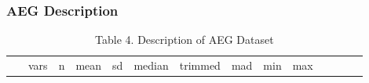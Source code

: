 \subsubsection{AEG Description}\label{aeg-description}

\begin{Shaded}
\begin{Highlighting}[]
\NormalTok{(}\NormalTok{(AEG[,}\NormalTok{:}\NormalTok{]), } \NormalTok{, } \NormalTok{)}
\end{Highlighting}
\end{Shaded}

\begin{longtable}[]{@{}cccccccccccccc@{}}
\caption{Table 4. Description of AEG Dataset}\tabularnewline
\toprule
\begin{minipage}[b]{0.07\columnwidth}\centering\strut
~\strut
\end{minipage} & \begin{minipage}[b]{0.04\columnwidth}\centering\strut
vars\strut
\end{minipage} & \begin{minipage}[b]{0.03\columnwidth}\centering\strut
n\strut
\end{minipage} & \begin{minipage}[b]{0.05\columnwidth}\centering\strut
mean\strut
\end{minipage} & \begin{minipage}[b]{0.05\columnwidth}\centering\strut
sd\strut
\end{minipage} & \begin{minipage}[b]{0.05\columnwidth}\centering\strut
median\strut
\end{minipage} & \begin{minipage}[b]{0.05\columnwidth}\centering\strut
trimmed\strut
\end{minipage} & \begin{minipage}[b]{0.05\columnwidth}\centering\strut
mad\strut
\end{minipage} & \begin{minipage}[b]{0.03\columnwidth}\centering\strut
min\strut
\end{minipage} & \begin{minipage}[b]{0.03\columnwidth}\centering\strut
max\strut
\end{minipage} & \begin{minipage}[b]{0.04\columnwidth}\centering\strut

\end{minipage}
\end{longtable}
